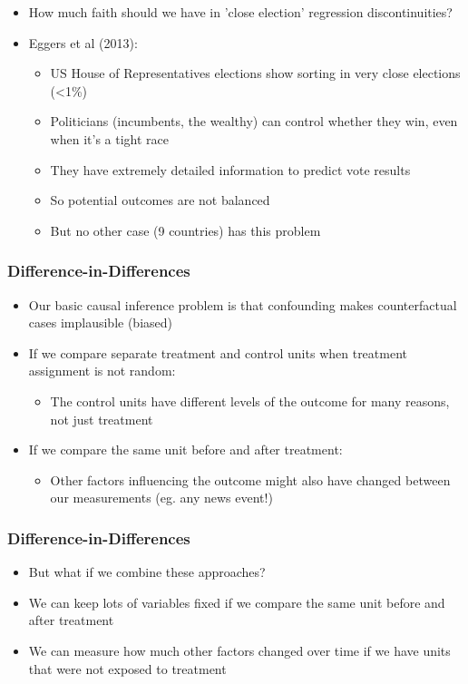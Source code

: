 \documentclass[xcolor=x11names,compress]{beamer}\usepackage[]{graphicx}\usepackage[]{color}
\renewcommand{\(}{\begin{columns}}
\renewcommand{\)}{\end{columns}}
\newcommand{\<}[1]{\begin{column}{#1}}
\renewcommand{\>}{\end{column}}
\begin{document}
\begin{frame}
\begin{itemize}
\item How much faith should we have in 'close election' regression discontinuities?
\pause
\item Eggers et al (2013):
\pause
\begin{itemize}
\item US House of Representatives elections show sorting in very close elections (<1\%)
\pause
\item Politicians (incumbents, the wealthy) can control whether they win, even when it's a tight race
\pause
\item They have extremely detailed information to predict vote results
\pause
\item So potential outcomes are not balanced
\pause
\item But no other case (9 countries) has this problem
\end{itemize}
\end{itemize}
\end{frame}




\begin{frame}
\frametitle{Difference-in-Differences}
\begin{itemize}
\item Our basic causal inference problem is that confounding makes counterfactual cases implausible (biased)
\pause
\item If we compare separate treatment and control units when treatment assignment is not random:
\begin{itemize}
\item The control units have different levels of the outcome for many reasons, not just treatment
\pause
\end{itemize}
\item If we compare the same unit before and after treatment:
\begin{itemize}
\item Other factors influencing the outcome might also have changed between our measurements (eg. any news event!)
\end{itemize}
\end{itemize}
\end{frame}

\begin{frame}
\frametitle{Difference-in-Differences}
\begin{itemize}
\item But what if we combine these approaches?
\pause
\item We can keep lots of variables fixed if we compare the same unit before and after treatment
\pause
\item We can measure how much other factors changed over time if we have units that were not exposed to treatment
\end{itemize}
\end{frame}
\end{document}
